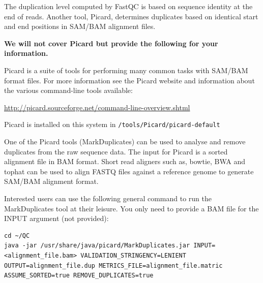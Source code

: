 \begin{advanced}
\begin{information}
The duplication level computed by FastQC is based on sequence identity at the
end of reads. Another tool, Picard, determines duplicates based on identical
start and end positions in SAM/BAM alignment files.

\textbf{We will not cover Picard but
provide the following for your information.}

Picard is a suite of tools for performing many common tasks with SAM/BAM format
files. For more information see the Picard website and information about the
various command-line tools available:

\url{http://picard.sourceforge.net/command-line-overview.shtml}
\end{information}

\begin{information}
Picard is installed on this system in \texttt{/tools/Picard/picard-default}

One of the Picard tools (MarkDuplicates) can be used to analyse and remove
duplicates from the raw sequence data. The input for Picard is a sorted
alignment file in BAM format. Short read aligners such as, bowtie, BWA and tophat
can be used to align FASTQ files against a reference genome to generate
SAM/BAM alignment format.
\end{information}

\begin{steps}
Interested users can use the following general command to run the
MarkDuplicates tool at their leisure. You only need to provide a BAM file for the
INPUT argument (not provided):


\begin{lstlisting}[style=command_syntax]
cd ~/QC
java -jar /usr/share/java/picard/MarkDuplicates.jar INPUT=<alignment_file.bam> VALIDATION_STRINGENCY=LENIENT OUTPUT=alignment_file.dup METRICS_FILE=alignment_file.matric ASSUME_SORTED=true REMOVE_DUPLICATES=true

\end{lstlisting}
\end{steps}

\end{advanced}
